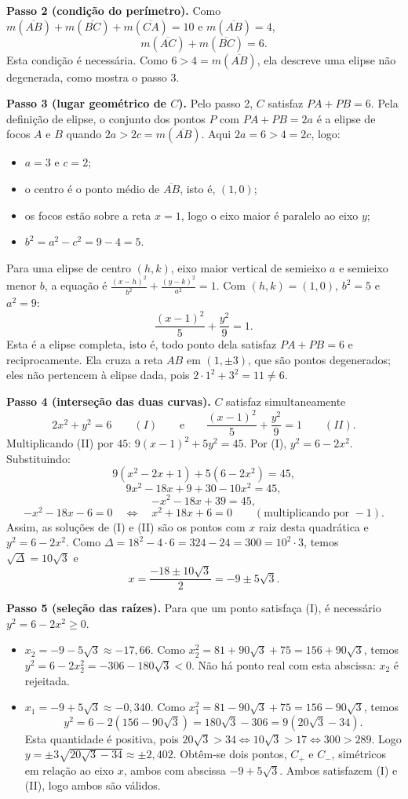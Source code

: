 \documentclass{article}%
\begin{document}
\textbf{Passo 2 (condição do perímetro).} Como $m(\overline{AB})+m(\overline{BC})+m(\overline{CA})=10$ e $m(\overline{AB})=4$,
\[ m(\overline{AC})+m(\overline{BC})=6. \]
Esta condição é necessária. Como $6>4=m(\overline{AB})$, ela descreve uma elipse não degenerada, como mostra o passo 3.

\textbf{Passo 3 (lugar geométrico de $C$).} Pelo passo 2, $C$ satisfaz $PA+PB=6$. Pela definição de elipse, o conjunto dos pontos $P$ com $PA+PB=2a$ é a elipse de focos $A$ e $B$ quando $2a>2c=m(\overline{AB})$. Aqui $2a=6>4=2c$, logo:
\begin{itemize}
\item $a=3$ e $c=2$;
\item o centro é o ponto médio de $\overline{AB}$, isto é, $(1,0)$;
\item os focos estão sobre a reta $x=1$, logo o eixo maior é paralelo ao eixo $y$;
\item $b^2=a^2-c^2=9-4=5$.
\end{itemize}
Para uma elipse de centro $(h,k)$, eixo maior vertical de semieixo $a$ e semieixo menor $b$, a equação é $\frac{(x-h)^2}{b^2}+\frac{(y-k)^2}{a^2}=1$. Com $(h,k)=(1,0)$, $b^2=5$ e $a^2=9$:
\[ \frac{(x-1)^2}{5}+\frac{y^2}{9}=1. \]
Esta é a elipse completa, isto é, todo ponto dela satisfaz $PA+PB=6$ e reciprocamente. Ela cruza a reta $AB$ em $(1,\pm 3)$, que são pontos degenerados; eles não pertencem à elipse dada, pois $2\cdot 1^2+3^2=11\neq 6$.

\textbf{Passo 4 (interseção das duas curvas).} $C$ satisfaz simultaneamente
\[ 2x^2+y^2=6 \qquad (I) \qquad\text{e}\qquad \frac{(x-1)^2}{5}+\frac{y^2}{9}=1 \qquad (II). \]
Multiplicando (II) por $45$: $9(x-1)^2+5y^2=45$. Por (I), $y^2=6-2x^2$. Substituindo:
\[ 9(x^2-2x+1)+5(6-2x^2)=45, \]
\[ 9x^2-18x+9+30-10x^2=45, \]
\[ -x^2-18x+39=45, \]
\[ -x^2-18x-6=0 \quad\Longleftrightarrow\quad x^2+18x+6=0 \qquad (\text{multiplicando por } -1). \]
Assim, as soluções de (I) e (II) são os pontos com $x$ raiz desta quadrática e $y^2=6-2x^2$. Como $\Delta=18^2-4\cdot 6=324-24=300=10^2\cdot 3$, temos $\sqrt{\Delta}=10\sqrt{3}$ e
\[ x=\frac{-18\pm 10\sqrt{3}}{2}=-9\pm 5\sqrt{3}. \]

\textbf{Passo 5 (seleção das raízes).} Para que um ponto satisfaça (I), é necessário $y^2=6-2x^2\geq 0$.
\begin{itemize}
\item $x_2=-9-5\sqrt{3}\approx -17{,}66$. Como $x_2^2=81+90\sqrt{3}+75=156+90\sqrt{3}$, temos $y^2=6-2x_2^2=-306-180\sqrt{3}<0$. Não há ponto real com esta abscissa: $x_2$ é rejeitada.
\item $x_1=-9+5\sqrt{3}\approx -0{,}340$. Como $x_1^2=81-90\sqrt{3}+75=156-90\sqrt{3}$, temos
\[ y^2=6-2\left(156-90\sqrt{3}\right)=180\sqrt{3}-306=9\left(20\sqrt{3}-34\right). \]
Esta quantidade é positiva, pois $20\sqrt{3}>34 \iff 10\sqrt{3}>17 \iff 300>289$. Logo $y=\pm 3\sqrt{20\sqrt{3}-34}\approx \pm 2{,}402$. Obtêm-se dois pontos, $C_{+}$ e $C_{-}$, simétricos em relação ao eixo $x$, ambos com abscissa $-9+5\sqrt{3}$. Ambos satisfazem (I) e (II), logo ambos são válidos.
\end{itemize}
\end{document}
